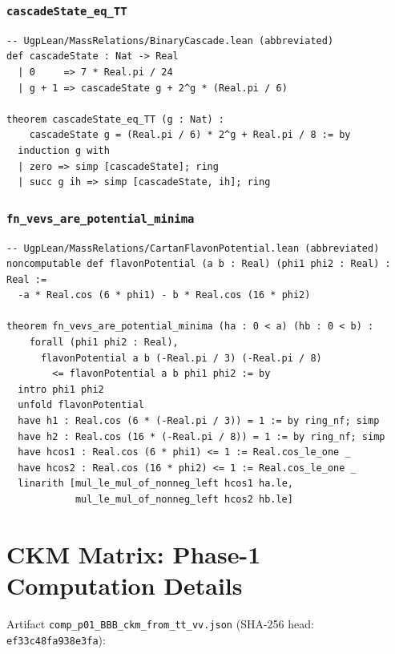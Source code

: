 \documentclass[11pt]{article}
\theoremstyle{remark}
\newcommand{\lean}[1]{\texttt{#1}}
\begin{document}
\subsubsection{\lean{cascadeState\_eq\_TT}}

\begin{verbatim}
-- UgpLean/MassRelations/BinaryCascade.lean (abbreviated)
def cascadeState : Nat -> Real
  | 0     => 7 * Real.pi / 24
  | g + 1 => cascadeState g + 2^g * (Real.pi / 6)

theorem cascadeState_eq_TT (g : Nat) :
    cascadeState g = (Real.pi / 6) * 2^g + Real.pi / 8 := by
  induction g with
  | zero => simp [cascadeState]; ring
  | succ g ih => simp [cascadeState, ih]; ring
\end{verbatim}

\subsubsection{\lean{fn\_vevs\_are\_potential\_minima}}

\begin{verbatim}
-- UgpLean/MassRelations/CartanFlavonPotential.lean (abbreviated)
noncomputable def flavonPotential (a b : Real) (phi1 phi2 : Real) : Real :=
  -a * Real.cos (6 * phi1) - b * Real.cos (16 * phi2)

theorem fn_vevs_are_potential_minima (ha : 0 < a) (hb : 0 < b) :
    forall (phi1 phi2 : Real),
      flavonPotential a b (-Real.pi / 3) (-Real.pi / 8)
        <= flavonPotential a b phi1 phi2 := by
  intro phi1 phi2
  unfold flavonPotential
  have h1 : Real.cos (6 * (-Real.pi / 3)) = 1 := by ring_nf; simp
  have h2 : Real.cos (16 * (-Real.pi / 8)) = 1 := by ring_nf; simp
  have hcos1 : Real.cos (6 * phi1) <= 1 := Real.cos_le_one _
  have hcos2 : Real.cos (16 * phi2) <= 1 := Real.cos_le_one _
  linarith [mul_le_mul_of_nonneg_left hcos1 ha.le,
            mul_le_mul_of_nonneg_left hcos2 hb.le]
\end{verbatim}

\section{CKM Matrix: Phase-1 Computation Details}
\label{sec:si_ckm}

Artifact \texttt{comp\_p01\_BBB\_ckm\_from\_tt\_vv.json}
(SHA-256 head: \texttt{ef33c48fa938e3fa}):
\end{document}
